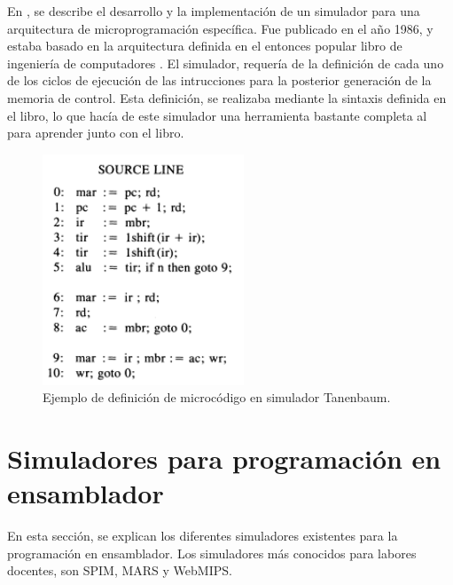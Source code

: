 En \cite{yen1986development}, se describe el desarrollo y la implementación de un simulador para una arquitectura de microprogramación específica. Fue publicado en el año 1986, y estaba basado en la arquitectura definida en el entonces popular libro de ingeniería de computadores \cite{tanenbaum1984}. El simulador, requería de la definición de cada uno de los ciclos de ejecución de las intrucciones para la posterior generación de la memoria de control. Esta definición, se realizaba mediante la sintaxis definida en el libro, lo que hacía de este simulador una herramienta bastante completa al para aprender junto con el libro. 

\begin{figure}[htbp]
 	\centering
 	\includegraphics[width=6cm]{figures/ejemploTanenbaum}
 	\caption{Ejemplo de definición de microcódigo en simulador Tanenbaum.}
	\label{fig:tanenbaum_figure}
\end{figure}


\section{Simuladores para programación en ensamblador}
\label{sec:simuladores_ensamblador}
En esta sección, se explican los diferentes simuladores existentes para la programación en ensamblador. Los simuladores más conocidos para labores docentes, son SPIM, MARS y WebMIPS.

